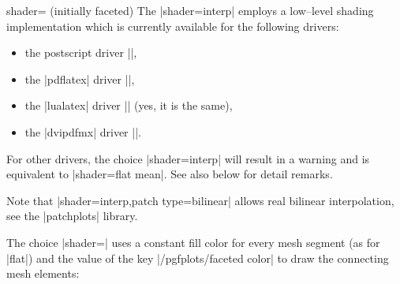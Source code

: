 {\begin{pgfplotskey}{shader= (initially faceted)}
	The |shader=interp| employs a low--level shading implementation which is currently available for the following drivers:
	\begin{itemize}
		\item the postscript driver |\def\pgfsysdriver{pgfsys-dvips.def}|,
		\item the |pdflatex| driver |\def\pgfsysdriver{pgfsys-pdftex.def}|,
		\item the |lualatex| driver |\def\pgfsysdriver{pgfsys-pdftex.def}| (yes, it is the same),
		\item the |dvipdfmx| driver |\def\pgfsysdriver{pgfsys-dvipdfmx.def}|.
	\end{itemize}
	For other drivers, the choice |shader=interp| will result in a warning and is equivalent to |shader=flat mean|. See also below for detail remarks.
	
	Note that |shader=interp,patch type=bilinear| allows real bilinear interpolation, see the |patchplots| library.


	The choice |shader=| uses a constant fill color for every mesh segment (as for |flat|) and the value of the key |/pgfplots/faceted color| to draw the connecting mesh elements:
\pgfplotsexpensiveexample
\begin{codeexample}[]
\end{codeexample}


\end{pgfplotskey}}
